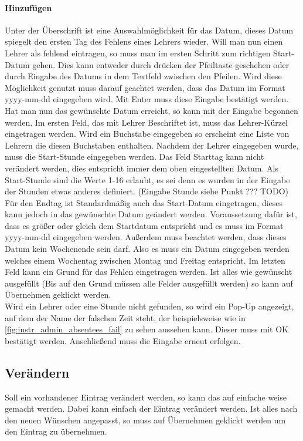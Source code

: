 \paragraph{Hinzufügen}
Unter der Überschrift ist eine Auswahlmöglichkeit für das Datum, dieses Datum spiegelt den ersten Tag des Fehlens eines Lehrers wieder. Will man nun einen Lehrer als fehlend eintragen, so muss man im ersten Schritt zum richtigen Start-Datum gehen. Dies kann entweder durch drücken der Pfeiltaste geschehen oder durch Eingabe des Datums in dem Textfeld zwischen den Pfeilen. Wird diese Möglichkeit genutzt muss darauf geachtet werden, dass das Datum im Format yyyy-mm-dd eingegeben wird. Mit Enter muss diese Eingabe bestätigt werden.\\
Hat man nun das gewünschte Datum erreicht, so kann mit der Eingabe begonnen werden. Im ersten Feld, das mit Lehrer Beschriftet ist, muss das Lehrer-Kürzel eingetragen werden. Wird ein Buchstabe eingegeben so erscheint eine Liste von Lehrern die diesen Buchstaben enthalten. Nachdem der Lehrer eingegeben wurde, muss die Start-Stunde eingegeben werden. Das Feld Starttag kann nicht verändert werden, dies entspricht immer dem oben eingestellten Datum. Als Start-Stunde sind die Werte 1-16 erlaubt, es sei denn es wurden in der Eingabe der Stunden etwas anderes definiert. (Eingabe Stunde siehe Punkt ??? TODO) Für den Endtag ist Standardmäßig auch das Start-Datum eingetragen, dieses kann jedoch in das gewünschte Datum geändert werden. Voraussetzung dafür ist, dass es größer oder gleich dem Startdatum entspricht und es muss im Format yyyy-mm-dd eingegeben werden. Außerdem muss beachtet werden, dass dieses Datum kein Wochenende sein darf. Also es muss ein Datum eingegeben werden welches einem Wochentag zwischen Montag und Freitag entspricht. Im letzten Feld kann  ein Grund für das Fehlen eingetragen werden. Ist alles wie gewünscht ausgefüllt (Bis auf den Grund müssen alle Felder ausgefüllt werden) so kann auf Übernehmen geklickt werden.\\
Wird ein Lehrer oder eine Stunde nicht gefunden, so wird ein Pop-Up angezeigt, auf dem der Name der falschen Zeit steht, der beispielsweise wie in \autoref{fig:instr_admin_absentees_fail} zu sehen aussehen kann. Dieser muss mit OK bestätigt werden. Anschließend muss die Eingabe erneut erfolgen.\
\subsection{Verändern}
Soll ein vorhandener Eintrag verändert werden, so kann das auf einfache weise gemacht werden. Dabei kann einfach der Eintrag verändert werden. Ist alles nach den neuen Wünschen angepasst, so muss auf Übernehmen geklickt werden um den Eintrag zu übernehmen.
